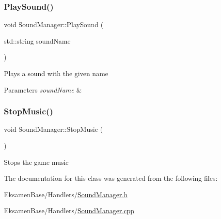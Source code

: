 \mbox{\label{class_sound_manager_af84f2acbde4d8c0d8f5b47c2d917e486}} 
\subsubsection{\texorpdfstring{Play\+Sound()}{PlaySound()}}
{\footnotesize\ttfamily void Sound\+Manager\+::\+Play\+Sound (\begin{DoxyParamCaption}\item[{std\+::string}]{sound\+Name }\end{DoxyParamCaption})}



Plays a sound with the given name 


\begin{DoxyParams}{Parameters}
{\em sound\+Name} & \\
\hline
\end{DoxyParams}
\mbox{\label{class_sound_manager_a8b26fc4974bebd09b4bd7e108e8394ae}} 
\subsubsection{\texorpdfstring{Stop\+Music()}{StopMusic()}}
{\footnotesize\ttfamily void Sound\+Manager\+::\+Stop\+Music (\begin{DoxyParamCaption}{ }\end{DoxyParamCaption})}



Stops the game music 



The documentation for this class was generated from the following files\+:\begin{DoxyCompactItemize}
\item 
Eksamen\+Base/\+Handlers/\mbox{\hyperlink{_sound_manager_8h}{Sound\+Manager.\+h}}\item 
Eksamen\+Base/\+Handlers/\mbox{\hyperlink{_sound_manager_8cpp}{Sound\+Manager.\+cpp}}\end{DoxyCompactItemize}
